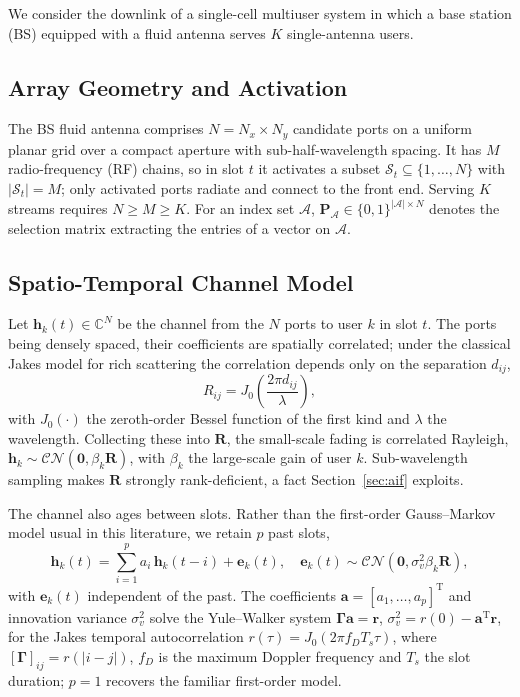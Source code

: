 \documentclass[journal]{IEEEtran}
\newcommand{\bh}{\mathbf{h}}
\newcommand{\bR}{\mathbf{R}}
\newcommand{\bP}{\mathbf{P}}
\newcommand{\CN}{\mathcal{CN}}
\newcommand{\bbC}{\mathbb{C}}
\begin{document}
We consider the downlink of a single-cell multiuser system in which a base
station (BS) equipped with a fluid antenna serves $K$ single-antenna users.

\subsection{Array Geometry and Activation}
The BS fluid antenna comprises $N=N_x\times N_y$ candidate ports on a uniform
planar grid over a compact aperture with sub-half-wavelength spacing. It has
$M$ radio-frequency (RF) chains, so in slot $t$ it activates a subset
$\mathcal{S}_t\subseteq\{1,\dots,N\}$ with $|\mathcal{S}_t|=M$; only activated
ports radiate and connect to the front end. Serving $K$ streams requires
$N\ge M\ge K$. For an index set $\mathcal{A}$,
$\bP_{\mathcal{A}}\in\{0,1\}^{|\mathcal{A}|\times N}$ denotes the selection
matrix extracting the entries of a vector on $\mathcal{A}$.

\subsection{Spatio-Temporal Channel Model}
Let $\bh_k(t)\in\bbC^{N}$ be the channel from the $N$ ports to user $k$ in slot
$t$. The ports being densely spaced, their coefficients are spatially
correlated; under the classical Jakes model for rich scattering the correlation
depends only on the separation $d_{ij}$,
\begin{equation}
  R_{ij} = J_0\!\left(\frac{2\pi d_{ij}}{\lambda}\right),
  \label{eq:R}
\end{equation}
with $J_0(\cdot)$ the zeroth-order Bessel function of the first kind and
$\lambda$ the wavelength. Collecting these into $\bR$, the small-scale fading
is correlated Rayleigh, $\bh_k\sim\CN(\mathbf{0},\beta_k\bR)$, with $\beta_k$
the large-scale gain of user $k$. Sub-wavelength sampling makes $\bR$ strongly
rank-deficient, a fact Section~\ref{sec:aif} exploits.

The channel also ages between slots. Rather than the first-order Gauss--Markov
model usual in this literature, we retain $p$ past slots,
\begin{equation}
  \bh_k(t) = \sum_{i=1}^{p} a_i\,\bh_k(t-i) + \mathbf{e}_k(t),
  \quad
  \mathbf{e}_k(t)\sim\CN(\mathbf{0},\sigma_v^2\beta_k\bR),
  \label{eq:ar}
\end{equation}
with $\mathbf{e}_k(t)$ independent of the past. The coefficients
$\mathbf{a}=[a_1,\dots,a_p]^{\mathrm{T}}$ and innovation variance $\sigma_v^2$
solve the Yule--Walker system $\boldsymbol{\Gamma}\mathbf{a}=\mathbf{r}$,
$\sigma_v^2=r(0)-\mathbf{a}^{\mathrm{T}}\mathbf{r}$, for the Jakes temporal
autocorrelation $r(\tau)=J_0(2\pi f_D T_s\tau)$, where
$[\boldsymbol{\Gamma}]_{ij}=r(|i-j|)$, $f_D$ is the maximum Doppler frequency
and $T_s$ the slot duration; $p=1$ recovers the familiar first-order model.
\end{document}
